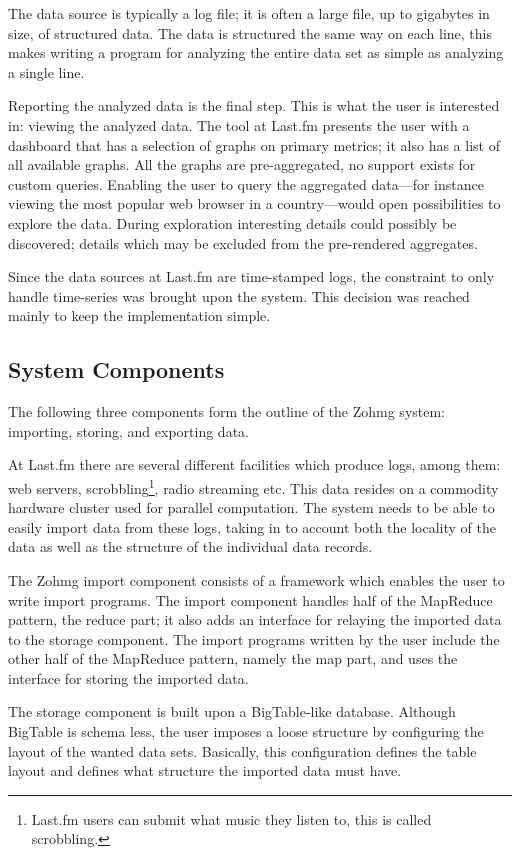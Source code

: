The data source is typically a log file; it is often a large file, up to
gigabytes in size, of structured data. The data is structured the same way on
each line, this makes writing a program for analyzing the entire data set as
simple as analyzing a single line.

Reporting the analyzed data is the final step. This is what the user is
interested in: viewing the analyzed data. The tool at Last.fm presents the user
with a dashboard that has a selection of graphs on primary metrics; it also has
a list of all available graphs. All the graphs are pre-aggregated, no support
exists for custom queries. Enabling the user to query the aggregated data---for
instance viewing the most popular web browser in a country---would open
possibilities to explore the data. During exploration interesting details could
possibly be discovered; details which may be excluded from the pre-rendered
aggregates.

Since the data sources at Last.fm are time-stamped logs, the constraint to only
handle time-series was brought upon the system. This decision was reached
mainly to keep the implementation simple.


\subsection*{System Components}

The following three components form the outline of the Zohmg system: importing,
storing, and exporting data.

At Last.fm there are several different facilities which produce logs, among
them: web servers, scrobbling\footnote{Last.fm users can submit what music they
listen to, this is called scrobbling.}, radio streaming etc. This data resides
on a commodity hardware cluster used for parallel computation. The system needs to
be able to easily import data from these logs, taking in to account both the
locality of the data as well as the structure of the individual data records.

The Zohmg import component consists of a framework which enables the user to
write import programs. The import component handles half of the MapReduce
pattern, the reduce part; it also adds an interface for relaying the imported
data to the storage component. The import programs written by the user include
the other half of the MapReduce pattern, namely the map part, and uses the
interface for storing the imported data.

The storage component is built upon a BigTable-like database. Although BigTable
is schema less, the user imposes a loose structure by configuring the layout of
the wanted data sets. Basically, this configuration defines the table layout and
defines what structure the imported data must have.

